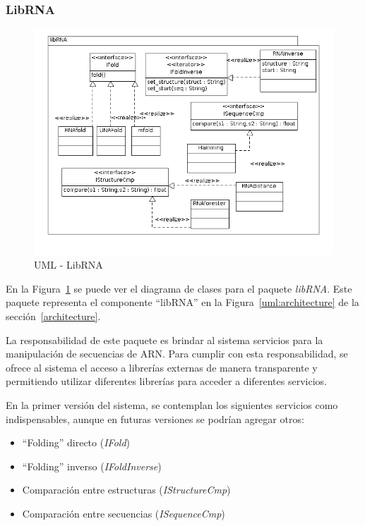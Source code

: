   \subsubsection{LibRNA}
   \begin{figure}
      \centering
      \includegraphics[scale=0.5]{lld-librna.png}  
      \caption{UML - LibRNA}
      \label{uml:lld-librna}
    \end{figure}

  En la Figura~\ref{uml:lld-librna} se puede ver el diagrama de clases
para el paquete \textit{libRNA}. Este paquete representa el componente
``libRNA'' en la Figura~\ref{uml:architecture} de la
secci\'on~\ref{architecture}.

  La responsabilidad de este paquete es brindar al sistema servicios para la
manipulaci\'on de secuencias de ARN. Para cumplir con esta responsabilidad, se
ofrece al sistema el acceso a librer\'ias externas de manera transparente y
permitiendo utilizar diferentes librer\'ias para acceder a diferentes servicios.

  En la primer versi\'on del sistema, se contemplan los siguientes servicios
como indispensables, aunque en futuras versiones se podr\'ian agregar otros:

  \begin{itemize}
   \item ``Folding'' directo (\textit{IFold})
   \item ``Folding'' inverso (\textit{IFoldInverse})
   \item Comparaci\'on entre estructuras (\textit{IStructureCmp})
   \item Comparaci\'on entre secuencias (\textit{ISequenceCmp})
  \end{itemize}

